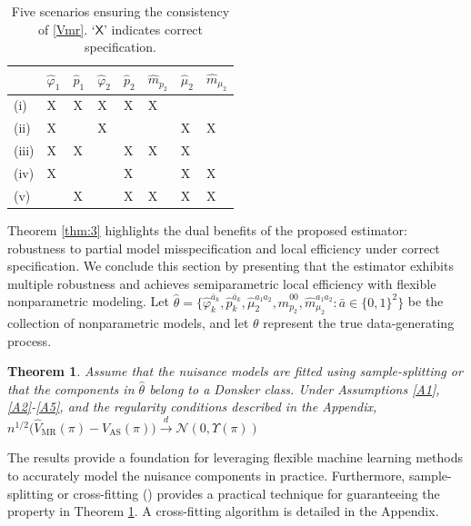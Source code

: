 \documentclass{article}
\newcommand{\wh}{\widehat}
\newcommand{\pk}{{\varphi}}
\newcommand{\tbl}[1]{\caption{#1}}
\newcommand{\XX}{\textsf{X}}
\newcommand{\supp}{\textrm{Appendix}}
\newtheorem{theorem}{Theorem}
\begin{document}
\begin{table}[]
\tbl{Five scenarios ensuring the consistency of \eqref{Vmr}. `$\XX$' indicates correct specification.} \label{tbl:mr}
\begin{center}
	\begin{tabular}{@{}llllllll@{}}
	\toprule
	      & $\wh\pk_1$ & $\wh p_1$ & $\wh\pk_2$ & $\wh p_2$ & $\wh m_{p_2}$ & $\wh\mu_2$ & $\wh m_{\mu_2}$ \\ \midrule
	(i)   & \XX   & \XX         & \XX          & \XX         & \XX             &            &                 \\
	(ii)  & \XX          &           & \XX          &           &               & \XX          & \XX               \\
	(iii) & \XX          & \XX         &            & \XX         & \XX             & \XX          &                 \\
	(iv)  & \XX          &           &            & \XX         &               & \XX          & \XX               \\
	(v)   &            & \XX         &            & \XX         & \XX             & \XX          & \XX               \\ \bottomrule
	\end{tabular}
\end{center}
\end{table}
	
	Theorem \ref{thm:3} highlights the dual benefits of the proposed estimator: robustness to partial model misspecification and local efficiency under correct specification. 
	We conclude this section by presenting that the estimator exhibits multiple robustness and achieves semiparametric local efficiency with flexible nonparametric modeling. 
	Let $\hat\theta = \{ \wh{\pk}_k^{\bar a_k}, \wh p_k^{\bar a_k}, \wh\mu_2^{a_1a_2}, \wh m_{p_2}^{00}, \wh m_{\mu_2}^{a_1a_2}: \bar a\in\{0,1\}^2 \}$ be the collection of nonparametric models, and let $\theta$ represent the true data-generating process.
	
	\begin{theorem} \label{thm:4}
		Assume that the nuisance models are fitted using sample-splitting 
		or that the components in $\hat{\theta}$ belong to a Donsker class. Under Assumptions \ref{A1}, \ref{A2}-\ref{A5}, and the regularity conditions described in the \supp, 
		$n^{1/2} \big( \wh V_\text{MR}(\pi) - V_\text{AS}(\pi) \big) \overset d\to \mathcal N\left(0, \Upsilon(\pi)\right)$
	\end{theorem}
	The results provide a foundation for leveraging flexible machine learning methods to accurately model the nuisance components in practice. 
	Furthermore, sample-splitting or cross-fitting (\citealp{chernozhukov2018double}) provides a practical technique for guaranteeing the property in Theorem \ref{thm:4}. 
	{A cross-fitting algorithm is detailed in the \supp.}
	
\end{document}
